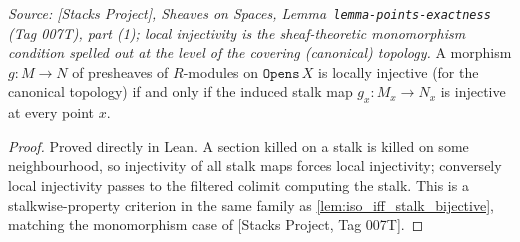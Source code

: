 \begin{lemma}
  \label{lem:locally_injective_iff_stalk}
  \textit{Source: [Stacks Project], Sheaves on Spaces, Lemma~\texttt{lemma-points-exactness}
  (Tag 007T), part (1); local injectivity is the sheaf-theoretic monomorphism condition
  spelled out at the level of the covering (canonical) topology.}
  A morphism \(g\colon M \to N\) of presheaves of \(R\)-modules on \(\mathtt{Opens}\,X\)
  is locally injective (for the canonical topology) if and only if the induced stalk map
  \(g_x\colon M_x \to N_x\) is injective at every point \(x\).
\end{lemma}
\begin{proof}
  Proved directly in Lean. A section killed on a stalk is killed on some neighbourhood,
  so injectivity of all stalk maps forces local injectivity; conversely local
  injectivity passes to the filtered colimit computing the stalk. This is a
  stalkwise-property criterion in the same family as \cref{lem:iso_iff_stalk_bijective},
  matching the monomorphism case of [Stacks Project, Tag 007T].
\end{proof}

